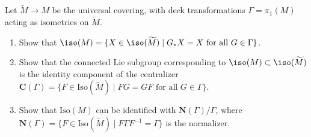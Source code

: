 \begin{remark}
  \label{rem:pet-ch8-ex-8-4-18}
  Let $\widetilde M\to M$ be the universal covering, with deck transformations
  $\Gamma=\pi_1(M)$ acting as isometries on $\widetilde M$.
  \begin{enumerate}
    \item Show that
      $\iso(M)=\{X\in\iso(\widetilde M)\mid G_*X=X\text{ for all }G\in\Gamma\}$.
    \item Show that the connected Lie subgroup corresponding to
      $\iso(M)\subset\iso(\widetilde M)$ is the identity component of the
      centralizer
      $\mathbf C(\Gamma)=\{F\in\mathrm{Iso}(\widetilde M)\mid FG=GF\text{ for all }G\in\Gamma\}$.
    \item Show that $\mathrm{Iso}(M)$ can be identified with
      $\mathbf N(\Gamma)/\Gamma$, where
      $\mathbf N(\Gamma)=\{F\in\mathrm{Iso}(\widetilde M)\mid F\Gamma F^{-1}=\Gamma\}$
      is the normalizer.
  \end{enumerate}
\end{remark}
